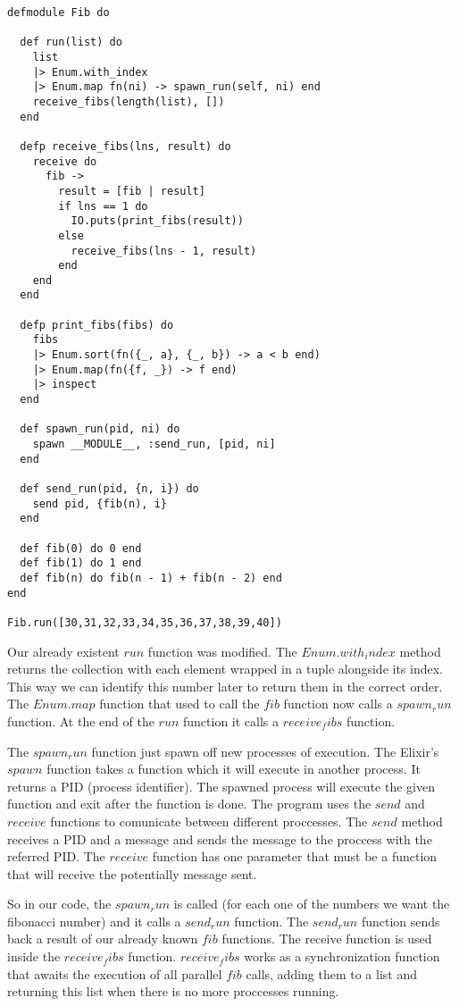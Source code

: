 \begin{lstlisting}[label=epf,caption=Parallel processing for Fibonacci in Elixir]
defmodule Fib do

  def run(list) do
    list
    |> Enum.with_index
    |> Enum.map fn(ni) -> spawn_run(self, ni) end
    receive_fibs(length(list), [])
  end

  defp receive_fibs(lns, result) do
    receive do
      fib ->
        result = [fib | result]
        if lns == 1 do
          IO.puts(print_fibs(result))
        else
          receive_fibs(lns - 1, result)
        end
    end
  end

  defp print_fibs(fibs) do
    fibs
    |> Enum.sort(fn({_, a}, {_, b}) -> a < b end)
    |> Enum.map(fn({f, _}) -> f end)
    |> inspect
  end

  def spawn_run(pid, ni) do
    spawn __MODULE__, :send_run, [pid, ni]
  end

  def send_run(pid, {n, i}) do
    send pid, {fib(n), i}
  end

  def fib(0) do 0 end
  def fib(1) do 1 end
  def fib(n) do fib(n - 1) + fib(n - 2) end
end

Fib.run([30,31,32,33,34,35,36,37,38,39,40])
\end{lstlisting}

Our already existent $run$ function was modified. The $Enum.with_index$ 
method returns the collection with each element wrapped in a tuple alongside its
index. This way we can identify this number later to return them in the correct
order. The $Enum.map$ function that used to call the $fib$ function now 
calls a $spawn_run$ function. At the end of the $run$ function it calls a 
$receive_fibs$ function.

The $spawn_run$ function just spawn off new processes \cite{6_1}
of execution. The Elixir's $spawn$ function takes a function which it will 
execute in another process. It returns a PID (process identifier). The spawned 
process will execute the given function and exit after the function is done. The
program uses the $send$ and $receive$ functions to comunicate between 
different proccesses. The $send$ method receives a PID and a message and sends
the message to the proccess with the referred PID. The $receive$ function has 
one parameter that must be a function that will receive the potentially message 
sent. 

So in our code, the $spawn_run$ is called (for each one of the numbers we want
the fibonacci number) and it calls a $send_run$ function. The $send_run$ 
function sends back a result of our already known $fib$ functions. The receive
function is used inside the $receive_fibs$ function. $receive_fibs$ works as
a synchronization function that awaits the execution of all parallel $fib$ 
calls, adding them to a list and returning this list when there is no more 
proccesses running.

